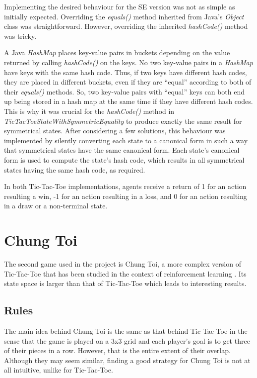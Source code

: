 \documentclass[11pt,a4paper]{report}
\begin{document}
Implementing the desired behaviour for the SE version was not as simple as initially expected. Overriding the \emph{equals()} method inherited from Java's \emph{Object} class was straightforward. However, overriding the inherited \emph{hashCode()} method was tricky.

A Java \emph{HashMap} places key-value pairs in buckets depending on the value returned by calling \emph{hashCode()} on the keys. No two key-value pairs in a \emph{HashMap} have keys with the same hash code. Thus, if two keys have different hash codes, they are placed in different buckets, even if they are ``equal'' according to both of their \emph{equals()} methods. So, two key-value pairs with ``equal'' keys can both end up being stored in a hash map at the same time if they have different hash codes. This is why it was crucial for the \emph{hashCode()} method in \emph{TicTacToeStateWithSymmetricEquality} to produce exactly the same result for symmetrical states. After considering a few solutions, this behaviour was implemented by silently converting each state to a canonical form in such a way that symmetrical states have the same canonical form. Each state's canonical form is used to compute the state's hash code, which results in all symmetrical states having the same hash code, as required.

In both Tic-Tac-Toe implementations, agents receive a return of 1 for an action resulting a win, -1 for an action resulting in a loss, and 0 for an action resulting in a draw or a non-terminal state.


\section{Chung Toi}
\label{sec:ChungToi}

The second game used in the project is Chung Toi, a more complex version of Tic-Tac-Toe that has been studied in the context of reinforcement learning \cite{chung-toi-rl}. Its state space is larger than that of Tic-Tac-Toe which leads to interesting results.


\subsection{Rules}
\label{sec:ChungToiRules}

The main idea behind Chung Toi \cite{chung-toi-rules} is the same as that behind Tic-Tac-Toe in the sense that the game is played on a 3x3 grid and each player's goal is to get three of their pieces in a row. However, that is the entire extent of their overlap. Although they may seem similar, finding a good strategy for Chung Toi is not at all intuitive, unlike for Tic-Tac-Toe.
\end{document}

